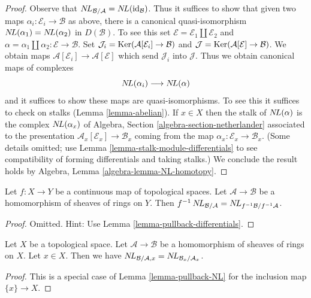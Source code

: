 \begin{proof}
Observe that $\mathop{N\!L}\nolimits_{\mathcal{B}/\mathcal{A}} = \mathop{N\!L}\nolimits(\text{id}_\mathcal{B})$.
Thus it suffices to show that given two maps
$\alpha_i : \mathcal{E}_i \to \mathcal{B}$ as above, there is a
canonical quasi-isomorphism $\mathop{N\!L}\nolimits(\alpha_1) = \mathop{N\!L}\nolimits(\alpha_2)$ in $D(\mathcal{B})$.
To see this set $\mathcal{E} = \mathcal{E}_1 \amalg \mathcal{E}_2$ and
$\alpha = \alpha_1 \amalg \alpha_2 : \mathcal{E} \to \mathcal{B}$.
Set
$\mathcal{J}_i = \mathop{\mathrm{Ker}}(\mathcal{A}[\mathcal{E}_i] \to \mathcal{B})$
and
$\mathcal{J} = \mathop{\mathrm{Ker}}(\mathcal{A}[\mathcal{E}] \to \mathcal{B})$.
We obtain maps $\mathcal{A}[\mathcal{E}_i] \to \mathcal{A}[\mathcal{E}]$
which send $\mathcal{J}_i$ into $\mathcal{J}$.
Thus we obtain canonical maps of complexes
$$
\mathop{N\!L}\nolimits(\alpha_i) \longrightarrow \mathop{N\!L}\nolimits(\alpha)
$$
and it suffices to show these maps are quasi-isomorphisms. To see this
it suffices to check on stalks (Lemma \ref{lemma-abelian}). If $x \in X$
then the stalk of $\mathop{N\!L}\nolimits(\alpha)$ is the complex $\mathop{N\!L}\nolimits(\alpha_x)$ of
Algebra, Section \ref{algebra-section-netherlander}
associated to the presentation $\mathcal{A}_x[\mathcal{E}_x] \to \mathcal{B}_x$
coming from the map $\alpha_x : \mathcal{E}_x \to \mathcal{B}_x$.
(Some details omitted; use Lemma \ref{lemma-stalk-module-differentials}
to see compatibility of forming differentials and taking stalks.)
We conclude the result holds by
Algebra, Lemma \ref{algebra-lemma-NL-homotopy}.
\end{proof}

\begin{lemma}
\label{lemma-pullback-NL}
Let $f : X \to Y$ be a continuous map of topological spaces.
Let $\mathcal{A} \to \mathcal{B}$ be a homomorphism of sheaves of rings
on $Y$. Then $f^{-1}\mathop{N\!L}\nolimits_{\mathcal{B}/\mathcal{A}} =
\mathop{N\!L}\nolimits_{f^{-1}\mathcal{B}/f^{-1}\mathcal{A}}$.
\end{lemma}

\begin{proof}
Omitted. Hint: Use Lemma \ref{lemma-pullback-differentials}.
\end{proof}

\begin{lemma}
\label{lemma-stalk-NL}
Let $X$ be a topological space. Let $\mathcal{A} \to \mathcal{B}$
be a homomorphism of sheaves of rings on $X$. Let $x \in X$.
Then we have $\mathop{N\!L}\nolimits_{\mathcal{B}/\mathcal{A}, x} =
\mathop{N\!L}\nolimits_{\mathcal{B}_x/\mathcal{A}_x}$.
\end{lemma}

\begin{proof}
This is a special case of Lemma \ref{lemma-pullback-NL}
for the inclusion map $\{x\} \to X$.
\end{proof}

